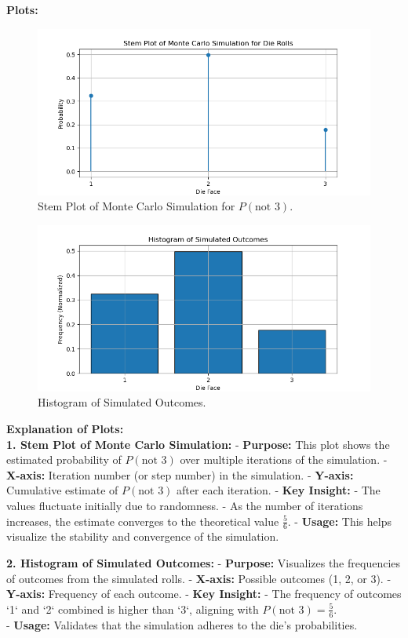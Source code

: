 \documentclass[journal]{IEEEtran}
\begin{document}
	\textbf{Plots:}  
	\begin{figure}[H]
		\includegraphics[width=\columnwidth]{figs/fig.png}
		\caption{Stem Plot of Monte Carlo Simulation for \( P(\text{not } 3) \).}
	\end{figure}
	
	\begin{figure}[H]
		\includegraphics[width=\columnwidth]{figs/fig2.png}
		\caption{Histogram of Simulated Outcomes.}
	\end{figure}
	
	\textbf{Explanation of Plots:}  \\
	\textbf{1. Stem Plot of Monte Carlo Simulation:}  
	- \textbf{Purpose:} This plot shows the estimated probability of \( P(\text{not } 3) \) over multiple iterations of the simulation.
	- \textbf{X-axis:} Iteration number (or step number) in the simulation.  
	- \textbf{Y-axis:} Cumulative estimate of \( P(\text{not } 3) \) after each iteration.  
	- \textbf{Key Insight:}  
	- The values fluctuate initially due to randomness.  
	- As the number of iterations increases, the estimate converges to the theoretical value \( \frac{5}{6} \).  
	- \textbf{Usage:} This helps visualize the stability and convergence of the simulation.  
	
	\textbf{2. Histogram of Simulated Outcomes:}  
	- \textbf{Purpose:} Visualizes the frequencies of outcomes from the simulated rolls.  
	- \textbf{X-axis:} Possible outcomes (1, 2, or 3).  
	- \textbf{Y-axis:} Frequency of each outcome.  
	- \textbf{Key Insight:}  
	- The frequency of outcomes `1` and `2` combined is higher than `3`, aligning with \( P(\text{not } 3) = \frac{5}{6} \). \\ 
	- \textbf{Usage:} Validates that the simulation adheres to the die's probabilities.  
	
\end{document}
